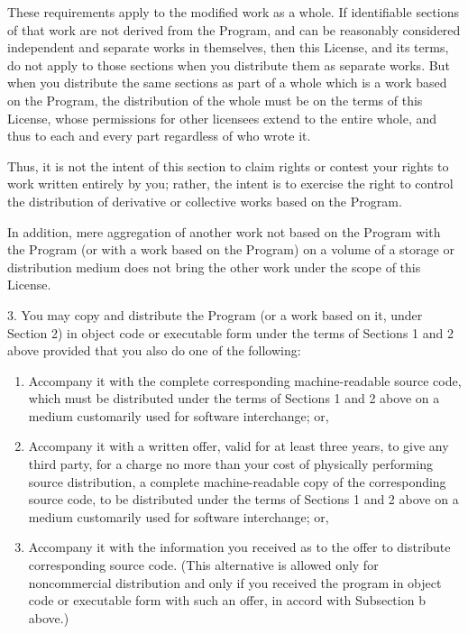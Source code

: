 \documentclass[a4paper, 11pt, twoside]{article}
\begin{document}
These requirements apply to the modified work as a whole. If identifiable sections of that work are not derived from the Program, and can be reasonably considered independent and separate works in themselves, then this License, and its terms, do not apply to those sections when you distribute them as separate works. But when you distribute the same sections as part of a whole which is a work based on the Program, the distribution of the whole must be on the terms of this License, whose permissions for other licensees extend to the entire whole, and thus to each and every part regardless of who wrote it.

Thus, it is not the intent of this section to claim rights or contest your rights to work written entirely by you; rather, the intent is to exercise the right to control the distribution of derivative or collective works based on the Program.

In addition, mere aggregation of another work not based on the Program with the Program (or with a work based on the Program) on a volume of a storage or distribution medium does not bring the other work under the scope of this License.

3. You may copy and distribute the Program (or a work based on it, under Section 2) in object code or executable form under the terms of Sections 1 and 2 above provided that you also do one of the following:

\begin{enumerate}[label=\Alph*)]
\item Accompany it with the complete corresponding machine-readable source code, which must be distributed under the terms of Sections 1 and 2 above on a medium customarily used for software interchange; or,
\item Accompany it with a written offer, valid for at least three years, to give any third party, for a charge no more than your cost of physically performing source distribution, a complete machine-readable copy of the corresponding source code, to be distributed under the terms of Sections 1 and 2 above on a medium customarily used for software interchange; or,
\item Accompany it with the information you received as to the offer to distribute corresponding source code. (This alternative is allowed only for noncommercial distribution and only if you received the program in object code or executable form with such an offer, in accord with Subsection b above.)
\end{enumerate}
\end{document}
